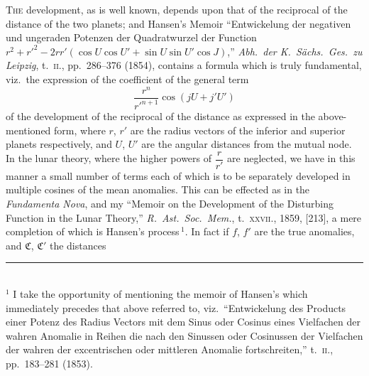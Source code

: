 \documentclass[12pt,a4paper]{article}
\theoremstyle{plain}
\begin{document}
T\textsc{he} development, as is well known, depends upon that of the reciprocal of the distance of the two planets; and Hansen's Memoir ``Entwickelung der negativen und ungeraden Potenzen der Quadratwurzel der Function $r^{2}+r'^{2}-2rr'(\cos U\cos U'+\sin U\sin U'\cos J)$,'' \textit{Abh.\ der K.\ S\"achs.\ Ges.\ zu Leipzig}, t.~\textsc{ii}., pp.~286--376 (1854), contains a formula which is truly fundamental, viz.\ the expression of the coefficient of the general term
\[
\frac{r^{n}}{r'^{n+1}}\cos(jU+j'U')
\]
of the development of the reciprocal of the distance as expressed in the above-mentioned form, where $r$, $r'$ are the radius vectors of the inferior and superior planets respectively, and $U$, $U'$ are the angular distances from the mutual node. In the lunar theory, where the higher powers of $\dfrac{r}{r'}$ are neglected, we have in this manner a small number of terms each of which is to be separately developed in multiple cosines of the mean anomalies. This can be effected as in the \textit{Fundamenta Nova}, and my ``Memoir on the Development of the Disturbing Function in the Lunar Theory,'' \textit{R.\ Ast.\ Soc.\ Mem.}, t.~\textsc{xxvii}., 1859, [213], a mere completion of which is Hansen's process\,$^{1}$. In fact if $f$, $f'$ are the true anomalies, and $\mathfrak{C}$, $\mathfrak{C}'$ the distances

\medskip
\noindent\rule{6cm}{0.4pt}\\[0.3em]
\noindent\small $^{1}$ I take the opportunity of mentioning the memoir of Hansen's which immediately precedes that above referred to, viz.\ ``Entwickelung des Products einer Potenz des Radius Vectors mit dem Sinus oder Cosinus eines Vielfachen der wahren Anomalie in Reihen die nach den Sinussen oder Cosinussen der Vielfachen der wahren der excentrischen oder mittleren Anomalie fortschreiten,'' t.~\textsc{ii}., pp.~183--281 (1853).
\end{document}
